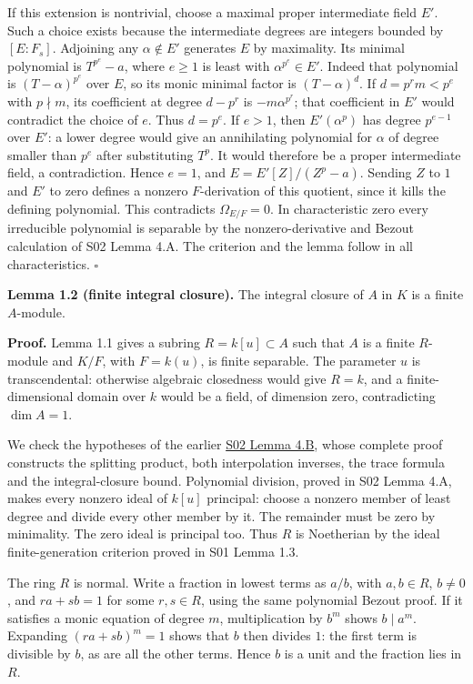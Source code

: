 \documentclass[11pt,a4paper,openany]{report}
\begin{document}
If this extension is nontrivial, choose a maximal proper intermediate field \(E'\). Such a choice exists because the intermediate degrees are integers bounded by \([E:F_s]\). Adjoining any \(\alpha\notin E'\) generates \(E\) by maximality. Its minimal polynomial is \(T^{p^e}-a\), where \(e\ge1\) is least with \(\alpha^{p^e}\in E'\). Indeed that polynomial is \((T-\alpha)^{p^e}\) over \(E\), so its monic minimal factor is \((T-\alpha)^d\). If \(d=p^r m<p^e\) with \(p\nmid m\), its coefficient at degree \(d-p^r\) is \(-m\alpha^{p^r}\); that coefficient in \(E'\) would contradict the choice of \(e\). Thus \(d=p^e\). If \(e>1\), then \(E'(\alpha^p)\) has degree \(p^{e-1}\) over \(E'\): a lower degree would give an annihilating polynomial for \(\alpha\) of degree smaller than \(p^e\) after substituting \(T^p\). It would therefore be a proper intermediate field, a contradiction. Hence \(e=1\), and \(E=E'[Z]/(Z^p-a)\). Sending \(Z\) to \(1\) and \(E'\) to zero defines a nonzero \(F\)-derivation of this quotient, since it kills the defining polynomial. This contradicts \(\Omega_{E/F}=0\). In characteristic zero every irreducible polynomial is separable by the nonzero-derivative and Bezout calculation of S02 Lemma 4.A. The criterion and the lemma follow in all characteristics. \(\square\)

\textbf{Lemma 1.2 (finite integral closure).} The integral closure of \(A\) in \(K\) is a finite \(A\)-module.

\textbf{Proof.} Lemma 1.1 gives a subring \(R=k[u]\subset A\) such that \(A\) is a finite \(R\)-module and \(K/F\), with \(F=k(u)\), is finite separable. The parameter \(u\) is transcendental: otherwise algebraic closedness would give \(R=k\), and a finite-dimensional domain over \(k\) would be a field, of dimension zero, contradicting \(\dim A=1\).

We check the hypotheses of the earlier \href{https://github.com/KokunoYumeto/open-math-courses/blob/main/docs/courses/AG-RG/AG-RG-S02.md}{S02 Lemma 4.B}, whose complete proof constructs the splitting product, both interpolation inverses, the trace formula and the integral-closure bound. Polynomial division, proved in S02 Lemma 4.A, makes every nonzero ideal of \(k[u]\) principal: choose a nonzero member of least degree and divide every other member by it. The remainder must be zero by minimality. The zero ideal is principal too. Thus \(R\) is Noetherian by the ideal finite-generation criterion proved in S01 Lemma 1.3.

The ring \(R\) is normal. Write a fraction in lowest terms as \(a/b\), with \(a,b\in R\), \(b\ne0\), and \(ra+sb=1\) for some \(r,s\in R\), using the same polynomial Bezout proof. If it satisfies a monic equation of degree \(m\), multiplication by \(b^m\) shows \(b\mid a^m\). Expanding \((ra+sb)^m=1\) shows that \(b\) then divides \(1\): the first term is divisible by \(b\), as are all the other terms. Hence \(b\) is a unit and the fraction lies in \(R\).
\end{document}
